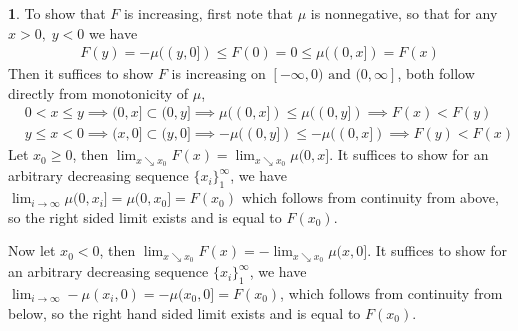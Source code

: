 \documentclass[10.5pt]{article}
\theoremstyle{definition}
\newtheorem{pb}{}
\newcommand{\set}[1]{\{#1\}}
\newcommand{\tand}{\text{ and }}
\begin{document}
    \begin{pb}
        To show that \(F\) is increasing, first note that \(\mu\) is nonnegative, so that for any \(x>0, \; y<0\) we have
        \begin{align*}
            F(y) = -\mu((y,0]) \leq F(0) = 0 \leq \mu((0,x]) = F(x)
        \end{align*}
        Then it suffices to show \(F\) is increasing on \([-\infty,0) \tand (0,\infty]\), both follow directly from monotonicity of \(\mu\),
        \begin{align*}
            &0 < x \leq y \implies (0,x] \subset (0,y] \implies \mu((0,x]) \leq \mu((0,y]) \implies F(x) < F(y) \\
            &y \leq x < 0 \implies (x,0] \subset (y,0] \implies -\mu((0,y]) \leq -\mu((0,x]) \implies F(y) < F(x)
        \end{align*}
        Let \(x_0 \geq 0\), then \(\lim_{x\searrow x_0}F(x) = \lim_{x\searrow x_0}\mu(0,x]\). It suffices to show for an arbitrary decreasing sequence \(\set{x_i}_1^\infty\), we have
        \(\lim_{i \to \infty}\mu(0,x_i] = \mu(0,x_0] = F(x_0)\) which follows from continuity from above, so the right sided limit exists and is equal to \(F(x_0)\).

        Now let \(x_0 < 0\), then \(\lim_{x\searrow x_0}F(x) = -\lim_{x\searrow x_0}\mu(x,0]\). It suffices to show for an arbitrary decreasing sequence \(\set{x_i}_1^\infty\), we have
        \(\lim_{i \to \infty}-\mu(x_i,0) = -\mu(x_0,0] = F(x_0)\), which follows from continuity from below, so the right hand sided limit exists and is equal to \(F(x_0)\).
    \end{pb}
\end{document}
